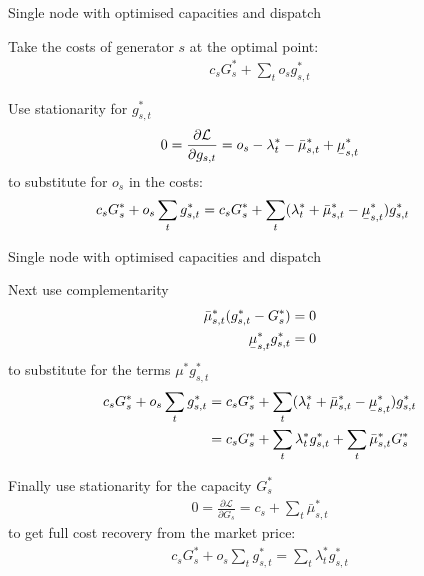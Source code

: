 \documentclass[10pt,dvipsnames]{beamer}
\def\l{\lambda}
\def\m{\mu}
\def\d{\partial}
\def\cL{\mathcal{L}}
\newcommand{\ubar}[1]{\text{\b{$#1$}}}
\begin{document}
\begin{frame}{Single node with optimised capacities and dispatch}

  Take the costs of generator $s$ at the optimal point:
  \begin{align*}
    c_s G_s^* +  \sum_{t}  o_{s} g_{s,t}^*
  \end{align*}

  Use stationarity for $g_{s,t}^*$
  \begin{align*}
        0 = \frac{\d \cL}{\d g_{s,t}}  = o_s - \l_t^* - \bar{\m}^*_{s,t} + \ubar{\m}^*_{s,t}
  \end{align*}
  to substitute for $o_s$ in the costs:
  \begin{align*}
    c_s G_s^* +  o_{s} \sum_{t}  g_{s,t}^* & =  c_s G_s^* + \sum_{t}( \l_t^* + \bar{\m}^*_{s,t} - \ubar{\m}^*_{s,t}) g_{s,t}^*
  \end{align*}
\end{frame}



\begin{frame}{Single node with optimised capacities and dispatch}

  Next use complementarity
  \begin{align*}
    \bar{\m}^*_{s,t}(g_{s,t}^* - G_s^*) & = 0 \\
    \ubar{\m}^*_{s,t}g_{s,t}^* & = 0
  \end{align*}
  to substitute for the terms $\m^*g_{s,t}^*$
  \begin{align*}
    c_s G_s^* +  o_{s} \sum_{t}  g_{s,t}^* & =  c_s G_s^* + \sum_{t}( \l_t^* + \bar{\m}^*_{s,t} - \ubar{\m}^*_{s,t}) g_{s,t}^* \\
    & = c_s G_s^* +  \sum_{t} \l_t^* g_{s,t}^* + \sum_t  \bar{\m}^*_{s,t} G_s^*
  \end{align*}

  Finally use stationarity for the capacity $G_s^*$
    \begin{align*}
        0 = \frac{\d \cL}{\d G_{s}}  = c_s + \sum_t \bar{\m}^*_{s,t}
  \end{align*}
  to get full cost recovery from the market price:
  \begin{align*}
    c_s G_s^* +  o_{s} \sum_{t}  g_{s,t}^* =  \sum_{t} \l_t^* g_{s,t}^*
  \end{align*}

\end{frame}
\end{document}
